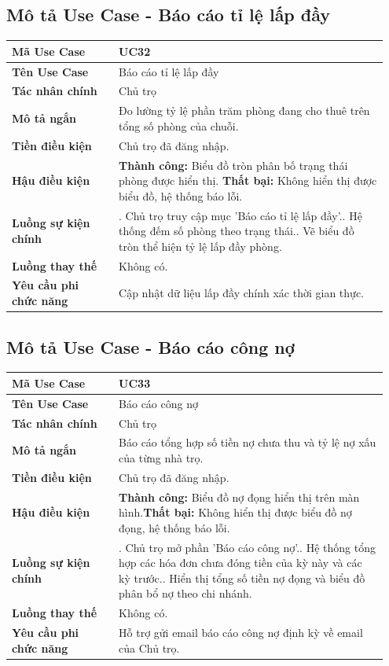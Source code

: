 \documentclass[a4paper,oneside]{report}
\begin{document}
\subsection{Mô tả Use Case - Báo cáo tỉ lệ lấp đầy}

\begin{longtable}[]{@{}>{\RaggedRight\arraybackslash}p{0.27\linewidth}>{\RaggedRight\arraybackslash}p{0.68\linewidth}@{}}
\toprule
\textbf{Mã Use Case} & UC32\tabularnewline
\midrule
\endhead
\textbf{Tên Use Case} & Báo cáo tỉ lệ lấp đầy\tabularnewline
\textbf{Tác nhân chính} & Chủ trọ\tabularnewline
\textbf{Mô tả ngắn} & Đo lường tỷ lệ phần trăm phòng đang cho thuê trên
tổng số phòng của chuỗi.\tabularnewline
\textbf{Tiền điều kiện} & Chủ trọ đã đăng nhập.\tabularnewline
\textbf{Hậu điều kiện} & \textbf{Thành công:} Biểu đồ tròn phân bố trạng thái phòng được hiển thị.\newline 
\textbf{Thất bại:} Không hiển thị được biểu đồ, hệ thống báo lỗi.\tabularnewline
\textbf{Luồng sự kiện chính} & 1. Chủ trọ truy cập
mục 'Báo cáo tỉ lệ lấp đầy'.\newline 2. Hệ thống đếm số phòng theo
trạng thái.\newline 3. Vẽ
biểu đồ tròn thể hiện tỷ lệ lấp đầy phòng.\tabularnewline
\textbf{Luồng thay thế} & Không có.\tabularnewline
\textbf{Yêu cầu phi chức năng} & Cập nhật dữ liệu lấp đầy chính xác thời
gian thực.\tabularnewline
\bottomrule
\end{longtable}

\subsection{Mô tả Use Case - Báo cáo công nợ}

\begin{longtable}[]{@{}>{\RaggedRight\arraybackslash}p{0.27\linewidth}>{\RaggedRight\arraybackslash}p{0.68\linewidth}@{}}
\toprule
\textbf{Mã Use Case} & UC33\tabularnewline
\midrule
\endhead
\textbf{Tên Use Case} & Báo cáo công nợ\tabularnewline
\textbf{Tác nhân chính} & Chủ trọ\tabularnewline
\textbf{Mô tả ngắn} & Báo cáo tổng hợp số tiền nợ chưa thu và tỷ lệ nợ
xấu của từng nhà trọ.\tabularnewline
\textbf{Tiền điều kiện} & Chủ trọ đã đăng nhập.\tabularnewline
\textbf{Hậu điều kiện} & \textbf{Thành công:} Biểu đồ nợ đọng hiển thị trên màn hình.\newline \textbf{Thất bại:} Không hiển thị được biểu đồ nợ đọng, hệ thống báo lỗi.\tabularnewline
\textbf{Luồng sự kiện chính} & 1. Chủ trọ mở phần
'Báo cáo công nợ'.\newline 2. Hệ thống tổng hợp các hóa đơn chưa
đóng tiền của kỳ này và các kỳ trước.\newline 3. Hiển thị tổng số
tiền nợ đọng và biểu đồ phân bổ nợ theo chi nhánh.\tabularnewline
\textbf{Luồng thay thế} & Không có.\tabularnewline
\textbf{Yêu cầu phi chức năng} & Hỗ trợ gửi email báo cáo công nợ định
kỳ về email của Chủ trọ.\tabularnewline
\bottomrule
\end{longtable}
\end{document}
